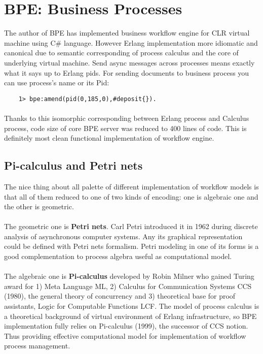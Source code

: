 \section{BPE: Business Processes}
The author of BPE has implemented business workflow engine for CLR virtual
machine using C\# language. However Erlang implementation more idiomatic
and canonical due to semantic corresponding of process calculus and
the core of underlying virtual machine. Send async messages across processes
means exactly what it says up to Erlang pids. For sending documents to
business process you can use process's name or its Pid:

\vspace{1\baselineskip}
\begin{lstlisting}
    1> bpe:amend(pid(0,185,0),#deposit{}).
\end{lstlisting}

\paragraph{}
Thanks to this isomorphic corresponding between Erlang process and Calculus process,
code size of core BPE server was reduced to 400 lines of code. This is definitely
most clean functional implementation of workflow engine.

\subsection{Pi-calculus and Petri nets}
The nice thing about all palette of different implementation of workflow models is
that all of them reduced to one of two kinds of encoding: one is algebraic one and
the other is geometric.

\paragraph{}
The geometric one is {\bf Petri nets}. Carl Petri introduced it in 1962 during discrete
analysis of asynchronous computer systems. Any its graphical representation could be
defined with Petri nets formalism. Petri modeling in one of its forms is a good
complementation to process algebra useful as computational model.

\paragraph{}
The algebraic one is {\bf Pi-calculus} developed by Robin Milner who gained
Turing award for 1) Meta Language ML, 2) Calculus for Communication Systems CCS (1980),
the general theory of concurrency and 3) theoretical base for proof assistants,
Logic for Computable Functions LCF.
The model of process calculus is a theoretical
background of virtual environment of Erlang infrastructure, so BPE
implementation fully relies on Pi-calculus (1999), the successor of CCS notion.
Thus providing effective computational model for implementation of workflow
process management.

